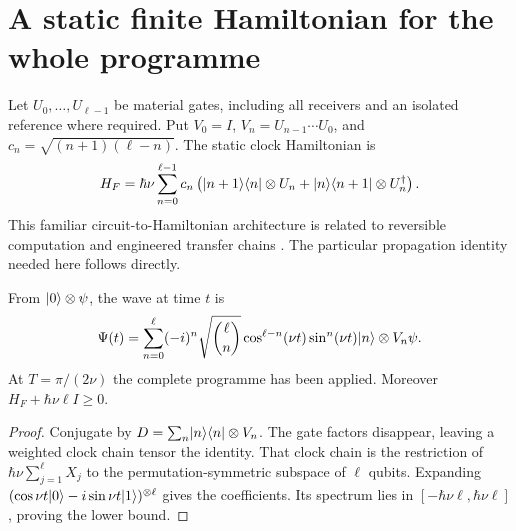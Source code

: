 \section{A static finite Hamiltonian for the whole programme}\label{section:pilot:a-static-finite-hamiltonian-for-the-whole-programme}
Let $U_0,\ldots,U_{\ell-1}$ be material gates, including all receivers and an isolated reference where required. Put $V_0=I$, $V_n=U_{n-1}\cdots U_0$, and $c_n=\sqrt{(n+1)(\ell-n)}$. The static clock Hamiltonian is
\begin{equation}\label{eq:clockH}
H_F=\hbar\nu\sum_{n=0}^{\ell-1}c_n
\left(\lvert n+1\rangle\langle n\rvert\otimes U_n+\lvert n\rangle\langle n+1\rvert\otimes U_n^\dagger\right).
\end{equation}
This familiar circuit-to-Hamiltonian architecture is related to reversible computation and engineered transfer chains \cite{Feynman1986,Christandl2004}. The particular propagation identity needed here follows directly.

\begin{theorem}\label{thm:clock}
From $\lvert 0\rangle\otimes\psi$, the wave at time $t$ is
\[
\Psi(t)=\sum_{n=0}^{\ell}(-i)^n\sqrt{\binom\ell n}
\cos^{\ell-n}(\nu t)\sin^n(\nu t)\lvert n\rangle\otimes V_n\psi.
\]
At $T=\pi/(2\nu)$ the complete programme has been applied. Moreover $H_F+\hbar\nu\ell I\ge0$.
\end{theorem}
\begin{proof}
Conjugate by $D=\sum_n\lvert n\rangle\langle n\rvert\otimes V_n$. The gate factors disappear, leaving a weighted clock chain tensor the identity. That clock chain is the restriction of $\hbar\nu\sum_{j=1}^{\ell}X_j$ to the permutation-symmetric subspace of $\ell$ qubits. Expanding
$(\cos\nu t\lvert 0\rangle-i\sin\nu t\lvert 1\rangle)^{\otimes\ell}$ gives the coefficients. Its spectrum lies in $[-\hbar\nu\ell,\hbar\nu\ell]$, proving the lower bound.
\end{proof}


